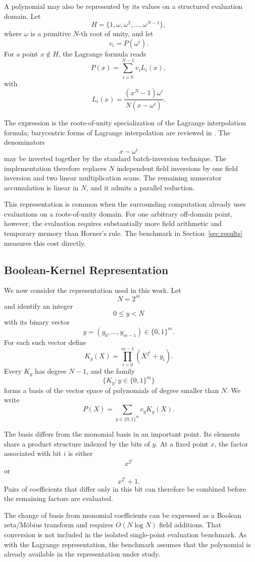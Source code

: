 A polynomial may also be represented by its values on a structured
evaluation domain.  Let
\[
H=
\{1,\omega,\omega^2,\ldots,\omega^{N-1}\},
\]
where \(\omega\) is a primitive \(N\)-th root of unity, and let
\[
v_i=P(\omega^i).
\]
For a point \(x\notin H\), the Lagrange formula reads
\[
P(x)=
\sum_{i=0}^{N-1}
v_i L_i(x),
\]
with
\[
L_i(x)
=
\frac{(x^N-1)\omega^i}
     {N(x-\omega^i)}.
\]

The expression is the roots-of-unity specialization of the Lagrange
interpolation formula; barycentric forms of Lagrange interpolation are
reviewed in \cite{berrut2004}.  The denominators
\[
x-\omega^i
\]
may be inverted together by the standard batch-inversion technique.  The
implementation therefore replaces \(N\) independent field inversions by
one field inversion and two linear multiplication scans.  The remaining
numerator accumulation is linear in \(N\), and it admits a parallel
reduction.

This representation is common when the surrounding computation already
uses evaluations on a roots-of-unity domain.  For one arbitrary
off-domain point, however, the evaluation requires substantially more
field arithmetic and temporary memory than Horner's rule.  The benchmark
in Section~\ref{sec:results} measures this cost directly.

\subsection{Boolean-Kernel Representation}
\label{sec:boolean-kernel}

We now consider the representation used in this work.  Let
\[
N=2^m
\]
and identify an integer
\[
0\le y<N
\]
with its binary vector
\[
y=(y_0,\ldots,y_{m-1})\in\{0,1\}^m.
\]
For each such vector define
\[
K_y(X)
=
\prod_{i=0}^{m-1}
\left(X^{2^i}+y_i\right).
\]
Every \(K_y\) has degree \(N-1\), and the family
\[
\{K_y : y\in\{0,1\}^m\}
\]
forms a basis of the vector space of polynomials of degree smaller than
\(N\).  We write
\[
P(X)
=
\sum_{y\in\{0,1\}^m}
c_yK_y(X).
\]

The basis differs from the monomial basis in an important point.  Its
elements share a product structure indexed by the bits of \(y\).  At a
fixed point \(x\), the factor associated with bit \(i\) is either
\[
x^{2^i}
\]
or
\[
x^{2^i}+1.
\]
Pairs of coefficients that differ only in this bit can therefore be
combined before the remaining factors are evaluated.

The change of basis from monomial coefficients can be expressed as a
Boolean zeta/Möbius transform and requires \(O(N\log N)\) field additions.
That conversion is not included in the isolated single-point evaluation
benchmark.  As with the Lagrange representation, the benchmark assumes that
the polynomial is already available in the representation under study.

